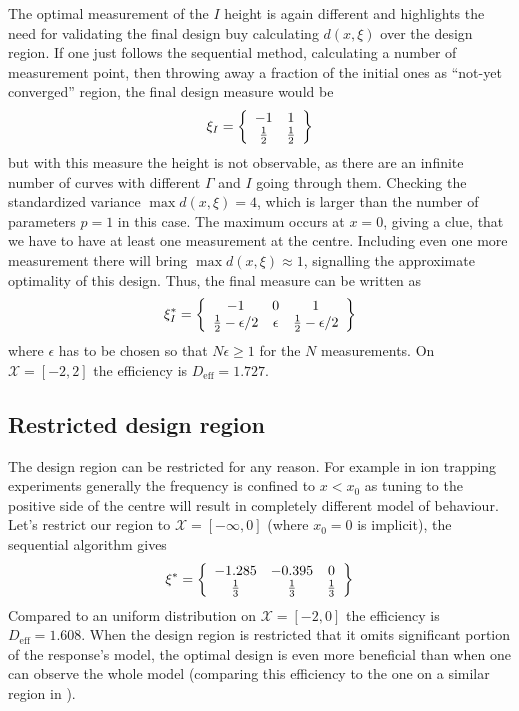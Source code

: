 \documentclass[12pt]{iopart}
\begin{document}
The optimal measurement of the $I$ height is again different and highlights the need for validating the final design buy calculating $d(x, \xi)$ over the design region. If one just follows the sequential method, calculating a number of measurement point, then throwing away a fraction of the initial ones as ``not-yet converged'' region, the final design measure would be
\begin{equation}
\xi_{I} = \left\{
  \begin{array}{c c}
    -1 &  1 \\
    \frac{1}{2} & \frac{1}{2}\\
  \end{array} \right \}
\end{equation}
but with this measure the height is not observable, as there are an infinite number of curves with different $\Gamma$ and $I$ going through them. Checking the standardized variance $\max d(x, \xi) = 4$, which is larger than the number of parameters $p = 1$ in this case. The maximum occurs at $x = 0$, giving a clue, that we have to have at least one measurement at the centre. Including even one more measurement there will bring $\max d(x, \xi) \approx 1$, signalling the approximate optimality of this design. Thus, the final measure can be written as
\begin{equation}
\xi^*_{I} = \left\{
  \begin{array}{c c c}
    -1 & 0 &  1 \\
    \frac{1}{2}-\epsilon/2 & \epsilon & \frac{1}{2}-\epsilon/2\\
  \end{array} \right \}
\end{equation}
where $\epsilon$ has to be chosen so that $N \epsilon \geq 1$ for the $N$ measurements. On $\mathcal{X} = [-2,2]$ the efficiency is $D_\mathrm{eff} = 1.727$.

\subsection{Restricted design region}

The design region can be restricted for any reason. For example in ion trapping experiments generally the frequency is confined to $x < x_0$ as tuning to the positive side of the centre will result in completely different model of behaviour. Let's restrict our region to $\mathcal{X} = [-\infty, 0]$ (where $x_0 = 0$ is implicit), the sequential algorithm gives
\begin{equation}
\xi^* = \left\{
  \begin{array}{c c c}
    -1.285 & -0.395 &  0 \\
     \frac{1}{3} & \frac{1}{3} & \frac{1}{3}\\
  \end{array} \right \}
\end{equation}
Compared to an uniform distribution on $\mathcal{X} = [-2,0]$ the efficiency is $D_\mathrm{eff} = 1.608$. When the design region is restricted that it omits significant portion of the response's model, the optimal design is even more beneficial than when one can observe the whole model (comparing this efficiency to the one on a similar region in ).
\end{document}
